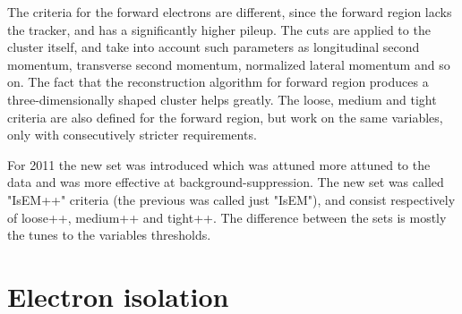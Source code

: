 The criteria for the forward electrons are different, since the forward region lacks the tracker, and has a significantly higher pileup. The cuts are applied to the cluster itself, and take into account such parameters as longitudinal second momentum, transverse second momentum, normalized lateral momentum and so on. The fact that the reconstruction algorithm for forward region produces a three-dimensionally shaped cluster helps greatly. The loose, medium and tight criteria are also defined for the forward region, but work on the same variables, only with consecutively stricter requirements.

For 2011 the new set was introduced which was attuned more attuned to the data and was more effective at background-suppression. The new set was called "IsEM++" criteria (the previous was called just "IsEM"), and consist respectively of loose++, medium++ and tight++. The difference between the sets is mostly the tunes to the variables thresholds.

\begin{figure}
\end{figure}

\section{Electron isolation}
\label{sec:Rec_eleciso}

